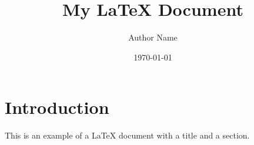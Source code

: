 \documentclass{article}
\title{My LaTeX Document}
\author{Author Name}
\date{\today}
\begin{document}
\maketitle

\section{Introduction}
This is an example of a LaTeX document with a title and a section.
\end{document}
